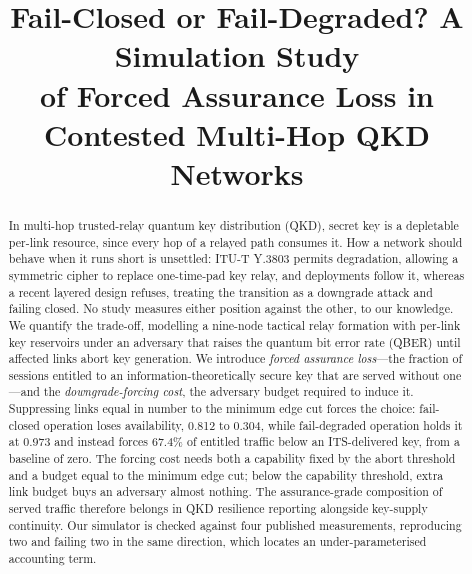 \documentclass[conference]{IEEEtran}
\begin{document}
\title{Fail-Closed or Fail-Degraded? A Simulation Study \\of Forced Assurance
Loss in Contested Multi-Hop QKD Networks}

\author{
}

\maketitle

\begin{abstract}
In multi-hop trusted-relay quantum key distribution (QKD), secret key is a
depletable per-link resource, since every hop of a relayed path consumes it. How a
network should behave when it runs short is unsettled: ITU-T Y.3803 permits
degradation, allowing a symmetric cipher to replace one-time-pad key relay, and
deployments follow it, whereas a recent layered design refuses, treating the
transition as a downgrade attack and failing closed. No study measures either
position against the other, to our knowledge. We quantify the trade-off, modelling a
nine-node tactical relay formation with per-link key reservoirs under an adversary
that raises the quantum bit error rate (QBER) until affected links abort key
generation. We introduce \emph{forced assurance loss}---the fraction of sessions
entitled to an information-theoretically secure key that are served without one---and
the \emph{downgrade-forcing cost}, the adversary budget required to induce it.
Suppressing links equal in number to the minimum edge cut forces the choice:
fail-closed operation loses availability, 0.812 to 0.304, while fail-degraded
operation holds it at 0.973 and instead forces 67.4\% of entitled traffic below an
ITS-delivered key, from a baseline of zero. The forcing cost needs both a capability
fixed by the abort threshold and a budget equal to the minimum edge cut; below the
capability threshold, extra link budget buys an adversary almost nothing. The
assurance-grade composition of served traffic therefore belongs in QKD resilience
reporting alongside key-supply continuity. Our simulator is checked against four
published measurements, reproducing two and failing two in the same direction, which
locates an under-parameterised accounting term.
\end{abstract}
\end{document}
